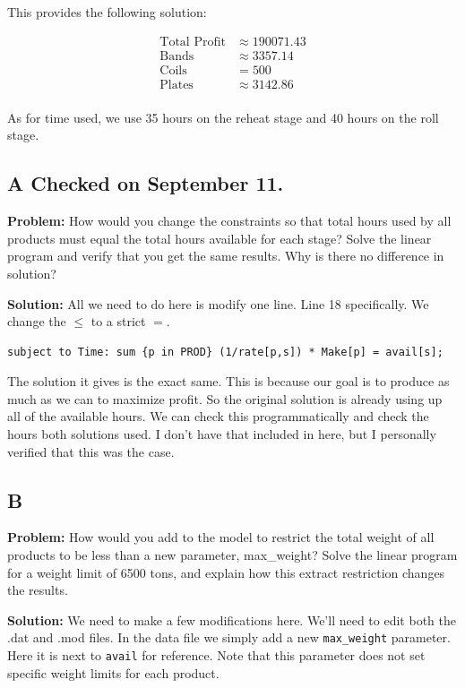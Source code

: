 This provides the following solution:

\begin{align*}
	\text{Total Profit} &\approx 190071.43 \\
	\text{Bands} &\approx 3357.14 \\
	\text{Coils} &= 500 \\
	\text{Plates} &\approx 3142.86 \\
\end{align*}

As for time used, we use 35 hours on the reheat stage and 40 hours on the roll stage.

\subsection*{A \checkmark Checked on September 11.}

\textbf{Problem:} How would you change the constraints so that total hours used by all products must equal the total hours available for each stage? Solve the linear program and verify that you get the same results. Why is there no difference in solution?

\noindent\textbf{Solution:} All we need to do here is modify one line. Line 18 specifically. We change the $\leq$ to a strict $=$. 

\begin{lstlisting}
subject to Time: sum {p in PROD} (1/rate[p,s]) * Make[p] = avail[s];
\end{lstlisting}

The solution it gives is the exact same. This is because our goal is to produce as much as we can to maximize profit. So the original solution is already using up all of the available hours. We can check this programmatically and check the hours both solutions used. I don't have that included in here, but I personally verified that this was the case. 

\subsection*{B}

\textbf{Problem:} How would you add to the model to restrict the total weight of all products to be less than a new parameter, max\_weight? Solve the linear program for a weight limit of 6500 tons, and explain how this extract restriction changes the results.

\noindent\textbf{Solution:} We need to make a few modifications here. We'll need to edit both the .dat and .mod files. In the data file we simply add a new \texttt{max\_weight} parameter. Here it is next to \texttt{avail} for reference. Note that this parameter does not set specific weight limits for each product. 

